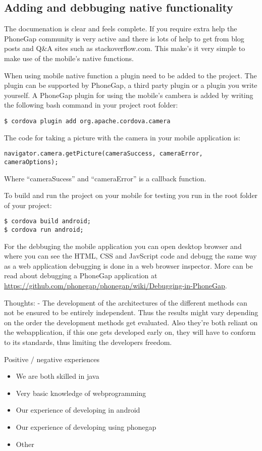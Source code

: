\subsection{Adding and debbuging native functionality}
The documenation is clear and feels complete. If you require extra help the PhoneGap community is very active and there is lots of help to get from blog posts and Q\&A sites such as stackoverflow.com. This make’s it very simple to make use of the mobile’s native functions. 

When using mobile native function a plugin need to be added to the project. The plugin can be supported by PhoneGap, a third party plugin or a plugin you write yourself. A PhoneGap plugin for using the mobile’s cambera is added by writing the following bash command in your project root folder:
\begin{verbatim}
$ cordova plugin add org.apache.cordova.camera
\end{verbatim}
The code for taking a picture with the camera in your mobile application is:
\begin{verbatim}
navigator.camera.getPicture(cameraSuccess, cameraError, cameraOptions);
\end{verbatim}
Where “cameraSucess” and “cameraError” is a callback function. 

To build and run the project on your mobile for testing you run in the root folder of your project:
\begin{verbatim}
$ cordova build android; 
$ cordova run android;
\end{verbatim}

For the debbuging the mobile application you can open desktop browser and where you can see the HTML, CSS and JavScript code and debugg the same way as a web application debugging is done in a web browser inspector. More can be read about debugging a PhoneGap application at \url{https://github.com/phonegap/phonegap/wiki/Debugging-in-PhoneGap}.



Thoughts:
 - The development of the architectures of the different methods can not be ensured to be entirely independent. Thus the results might vary depending on the order the development methods get evaluated. Also they're both reliant on the webapplication, if this one gets developed early on, they will have to conform to its standards, thus limiting the developers freedom. 

Positive / negative experiences
\begin{itemize}
    \item We are both skilled in java
    \item Very basic knowledge of webprogramming
    \item Our experience of developing in android
    \item Our experience of developing using phonegap
    \item Other
\end{itemize}

